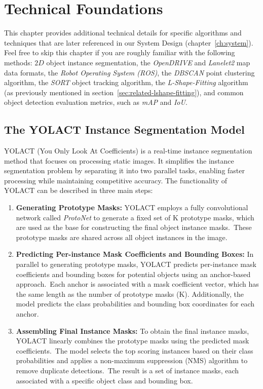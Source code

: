 
\chapter{Technical Foundations}
\label{ch:tech}

This chapter provides additional technical details for specific algorithms and techniques that are later referenced in our System Design (chapter~\ref{ch:system}). Feel free to skip this chapter if you are roughly familiar with the following methods: $2D$ object instance segmentation, the \textit{OpenDRIVE} and \textit{Lanelet2} map data formats, the \textit{Robot Operating System (ROS)}, the \textit{DBSCAN} point clustering algorithm, the \textit{SORT} object tracking algorithm, the \textit{L-Shape-Fitting} algorithm (as previously mentioned in section~\ref{sec:related-lshape-fitting}), and common object detection evaluation metrics, such as \textit{mAP} and \textit{IoU}.

\section{The YOLACT Instance Segmentation Model}
\label{sec:yolact}

YOLACT (You Only Look At Coefficients) is a real-time instance segmentation method that focuses on processing static images.
It simplifies the instance segmentation problem by separating it into two parallel tasks, enabling faster processing while maintaining competitive accuracy.
The functionality of YOLACT can be described in three main steps:

\begin{enumerate}
    \item \textbf{Generating Prototype Masks:} YOLACT employs a fully convolutional network called \textit{ProtoNet} to generate a fixed set of K prototype masks, which are used as the base for constructing the final object instance masks.\ These prototype masks are shared across all object instances in the image.
    \item \textbf{Predicting Per-instance Mask Coefficients and Bounding Boxes:} In parallel to generating prototype masks, YOLACT predicts per-instance mask coefficients and bounding boxes for potential objects using an anchor-based approach.\ Each anchor is associated with a mask coefficient vector, which has the same length as the number of prototype masks (K). Additionally, the model predicts the class probabilities and bounding box coordinates for each anchor.
    \item \textbf{Assembling Final Instance Masks:} To obtain the final instance masks, YOLACT linearly combines the prototype masks using the predicted mask coefficients.\ The model selects the top scoring instances based on their class probabilities and applies a non-maximum suppression (NMS) algorithm to remove duplicate detections.\ The result is a set of instance masks, each associated with a specific object class and bounding box.
\end{enumerate}

